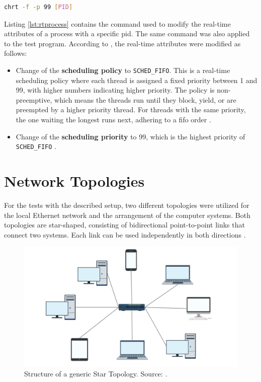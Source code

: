 \begin{lstlisting}[language=Bash, caption=Modification of the real-time Attributes of a Process., label=lst:rtprocess]
chrt -f -p 99 [PID]
\end{lstlisting}

Listing \ref{lst:rtprocess} contains the command used to modify the real-time attributes of a process with a specific \ac{pid}. The same command was also applied to the test program. According to \cite{swsetup05}, the real-time attributes were modified as follows:

\begin{itemize}
\item Change of the \textbf{scheduling policy} to \texttt{SCHED\_FIFO}. This is a real-time scheduling policy where each thread is assigned a fixed priority between 1 and 99, with higher numbers indicating higher priority. The policy is non-preemptive, which means the threads run until they block, yield, or are preempted by a higher priority thread. For threads with the same priority, the one waiting the longest runs next, adhering to a \ac{fifo} order \cite{swsetup06}.
\item Change of the \textbf{scheduling priority} to 99, which is the highest priority of \texttt{SCHED\_FIFO} \cite{swsetup06}.
\end{itemize}

\clearpage

\section{Network Topologies} \label{chap:Architectures}
For the tests with the described setup, two different topologies were utilized for the local Ethernet network and the arrangement of the computer systems. Both topologies are star-shaped, consisting of bidirectional point-to-point links that connect two systems. Each link can be used independently in both directions \cite{Tanenbaum2010}.


\begin{figure}[h]
    \centering
    \includegraphics[width=0.6\linewidth]{figures/method/topo1.png}
    \caption[Structure of a generic Star Topology]{Structure of a generic Star Topology. Source: \cite{topo01}.}
    \label{fig:startopoGeneral}
\end{figure}

